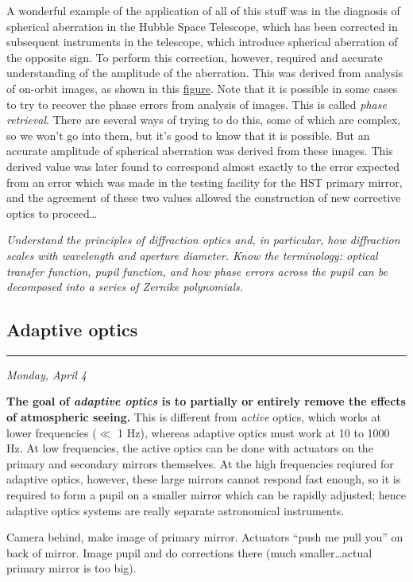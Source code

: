 \documentclass[12pt]{article}
\newcommand{\mynotes}[1]{\textcolor{myBlue}{#1}}
\newcommand{\test}[1]{%
    \begin{center}
        \colorbox{hl}{\parbox{0.9\textwidth}{\textit{\centering #1}}}
    \end{center}}
\newcommand{\mydate}[1]{
    \rule{\textwidth}{0.4pt}

    {\vspace{-1ex}\small\hfill\textit{#1}}}
\begin{document}
A wonderful example of the application of all of this stuff was in the
diagnosis of spherical aberration in the Hubble Space Telescope, which
has been corrected in subsequent instruments in the telescope, which
introduce spherical aberration of the opposite sign. To perform this
correction, however, required and accurate understanding of the
amplitude of the aberration. This was derived from analysis of
on-orbit images, as shown in this
\href{http://astronomy.nmsu.edu/holtz/a535/html/diagrams/a535/hstspher.htm}
{figure}.
Note that it is possible in
some cases to try to recover the phase errors from analysis of images.
This is called \textit{phase retrieval}. There are several ways of trying to do
this, some of which are complex, so we won't go into them, but it's
good to know that it is possible. But an accurate amplitude of
spherical aberration was derived from these images. This derived value
was later found to correspond almost exactly to the error expected
from an error which was made in the testing facility for the HST
primary mirror, and the agreement of these two values allowed the
construction of new corrective optics to proceed\ldots

\test{Understand the principles of diffraction optics and, in particular,
how diffraction scales with wavelength and aperture diameter. Know the
terminology: optical transfer function, pupil function, and how phase
errors across the pupil can be decomposed into a series of Zernike polynomials.}

\subsection{Adaptive optics}
\mydate{Monday, April 4}

\textbf{The goal of \textit{adaptive optics} is to partially or entirely remove
the effects of atmospheric seeing.} This is different from \textit{active}
optics, which works at lower frequencies ($\ll$ 1 Hz), whereas adaptive optics
must work at 10 to 1000 Hz.  At low frequencies, the active optics can be done
with actuators on the primary and secondary mirrors themselves.  At the high
frequencies reqiured for adaptive optics, however, these large mirrors cannot
respond fast enough, so it is required to form a pupil on a smaller mirror
which can be rapidly adjusted; hence adaptive optics systems are really
separate astronomical instruments.

\mynotes{Camera behind, make image of primary mirror.
Actuators ``push me pull you'' on back of mirror.
Image pupil and do corrections there (much smaller\ldots actual
primary mirror is too big).}
\end{document}

